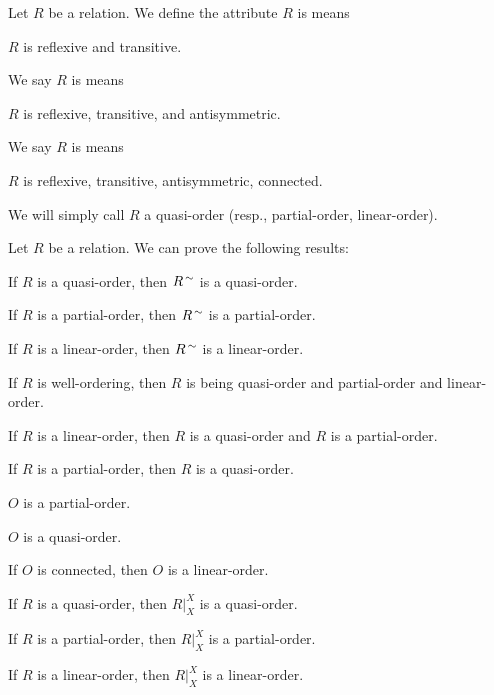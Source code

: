 \documentclass{article}
\begin{document}
\begin{definition}
Let $R$ be a relation.
We define the attribute $R$ is  means
\begin{defn}
\item $R$ is reflexive and transitive.
\end{defn}
We say $R$ is  means
\begin{defn}
\item $R$ is reflexive, transitive, and antisymmetric.
\end{defn}
We say $R$ is  means
\begin{defn}
\item $R$ is reflexive, transitive, antisymmetric, connected.
\end{defn}
\end{definition}

\begin{remark}
We will simply call $R$ a quasi-order (resp., partial-order, linear-order).
\end{remark}

Let $R$ be a relation.
We can prove the following results:
\begin{thm}
\item\label{orders1:16} If $R$ is a quasi-order, then $R^{\,\sim}$
  is a quasi-order.
\item\label{orders1:17} If $R$ is a partial-order, then
  $R^{\,\sim}$ is a partial-order.
\item\label{orders1:18} If $R$ is a linear-order, then
  $R^{\,\sim}$ is a linear-order.
\item\label{orders1:19} If $R$ is well-ordering, then $R$ is being
  quasi-order and partial-order and linear-order.
\item\label{orders1:20} If $R$ is a linear-order, then $R$ is a
  quasi-order and $R$ is a partial-order.
\item\label{orders1:21} If $R$ is a partial-order, then $R$ is a quasi-order.
\item\label{orders1:22} $O$ is a partial-order.
\item\label{orders1:23} $O$ is a quasi-order.
\item\label{orders1:24} If $O$ is connected, then $O$ is a linear-order.
\item\label{orders1:25} If $R$ is a quasi-order, then $R|^{X}_{X}$ is a quasi-order.
\item\label{orders1:26} If $R$ is a partial-order, then $R|^{X}_{X}$ is
  a partial-order.
\item\label{orders1:27} If $R$ is a linear-order, then $R|^{X}_{X}$ is a linear-order.
\end{thm}
\end{document}
